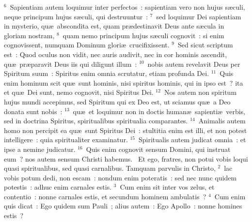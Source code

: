 ${}^{6}$~Sapientiam autem loquimur inter perfectos~: sapientiam vero non hujus s\ae culi, neque principum hujus s\ae culi, qui destruuntur~:
${}^{7}$~sed loquimur Dei sapientiam in mysterio, qu\ae\ abscondita est, quam pr\ae destinavit Deus ante s\ae cula in gloriam nostram,
${}^{8}$~quam nemo principum hujus s\ae culi cognovit~: si enim cognovissent, numquam Dominum glori\ae\ crucifixissent.
${}^{9}$~Sed sicut scriptum est~: Quod oculus non vidit, nec auris audivit, nec in cor hominis ascendit, qu\ae\ pr\ae paravit Deus iis qui diligunt illum~:
${}^{10}$~nobis autem revelavit Deus per Spiritum suum~: Spiritus enim omnia scrutatur, etiam profunda Dei.
${}^{11}$~Quis enim hominum scit qu\ae\ sunt hominis, nisi spiritus hominis, qui in ipso est~? ita et qu\ae\ Dei sunt, nemo cognovit, nisi Spiritus Dei.
${}^{12}$~Nos autem non spiritum hujus mundi accepimus, sed Spiritum qui ex Deo est, ut sciamus qu\ae\ a Deo donata sunt nobis~:
${}^{13}$~qu\ae\ et loquimur non in doctis human\ae\ sapienti\ae\ verbis, sed in doctrina Spiritus, spiritualibus spiritualia comparantes.
${}^{14}$~Animalis autem homo non percipit ea qu\ae\ sunt Spiritus Dei~: stultitia enim est illi, et non potest intelligere~: quia spiritualiter examinatur.
${}^{15}$~Spiritualis autem judicat omnia~: et ipse a nemine judicatur.
${}^{16}$~Quis enim cognovit sensum Domini, qui instruat eum~? nos autem sensum Christi habemus.
~Et ego, fratres, non potui vobis loqui quasi spiritualibus, sed quasi carnalibus. Tamquam parvulis in Christo,
${}^{2}$~lac vobis potum dedi, non escam~: nondum enim poteratis~: sed nec nunc quidem potestis~: adhuc enim carnales estis.
${}^{3}$~Cum enim sit inter vos zelus, et contentio~: nonne carnales estis, et secundum hominem ambulatis~?
${}^{4}$~Cum enim quis dicat~: Ego quidem sum Pauli~; alius autem~: Ego Apollo~: nonne homines estis~?


